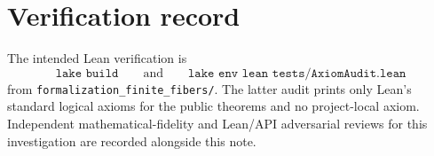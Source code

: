 \documentclass[11pt,reqno]{amsart}
\numberwithin{equation}{section}
\theoremstyle{definition}
\theoremstyle{remark}
\begin{document}
\section{Verification record}
\label{sec:verification}

The intended Lean verification is
\begin{equation}
  \texttt{lake build}
  \qquad\text{and}\qquad
  \texttt{lake env lean tests/AxiomAudit.lean}
  \label{eq:lean_verification_commands}
\end{equation}
from \texttt{formalization\_finite\_fibers/}.  The latter audit prints only
Lean's standard logical axioms for the public theorems and no project-local
axiom.  Independent mathematical-fidelity and Lean/API adversarial reviews
for this investigation are recorded alongside this note.
\end{document}
